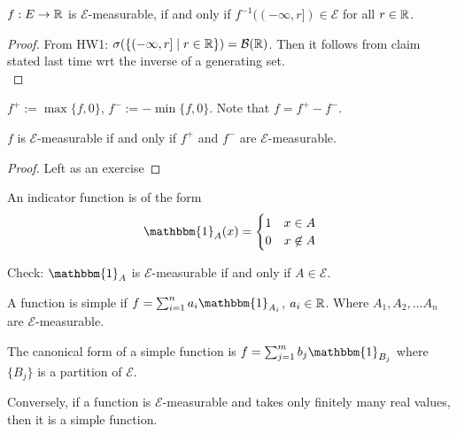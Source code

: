 \documentclass[english, course]{Notes}
\begin{document}
\begin{lemma}
$f: E \to \mathbb{R}$ is $\mathcal{E}$-measurable, if and only if $f^{-1}((-\infty, r]) \in \mathcal{E}$ for all $r \in \mathbb{R}$.\\
\end{lemma}

\begin{proof}
From HW1: $\sigma(\{(-\infty, r] \mid r \in \mathbb{R}\}) = \mathcal{B}(\mathbb{R})$. Then it follows from claim stated last time wrt the inverse of a generating set.\\
\end{proof}

\begin{definition}
$f^+:= \max\{f, 0\}$, $f^-:= -\min\{f, 0\}$. Note that $f = f^+ - f^-$.\\
\end{definition}

\begin{lemma}
$f$ is $\mathcal{E}$-measurable if and only if $f^+$ and $f^-$ are $\mathcal{E}$-measurable.
\end{lemma}

\begin{proof}
Left as an exercise
\end{proof}

\begin{definition}
An indicator function is of the form
\[\mathbbm{1}_A(x) =
\begin{cases}
1 & x \in A\\
0 & x \not \in A
\end{cases}\]
\end{definition}

Check: $\mathbbm{1}_A$ is $\mathcal{E}$-measurable if and only if $A \in \mathcal{E}$.\\

\begin{definition}
A function is simple if $f = \sum_{i = 1}^n a_i \mathbbm{1}_{A_i}$, $a_i \in \mathbb{R}$. Where $A_1, A_2, \dots A_n$ are $\mathcal{E}$-measurable.\\
\end{definition}

\begin{definition}
The canonical form of a simple function is $f = \sum_{j = 1}^m b_j \mathbbm{1}_{B_j}$ where $\{B_j\}$ is a partition of $\mathcal{E}$.\\
\end{definition}

\begin{fact}
Conversely, if a function is $\mathcal{E}$-measurable and takes only finitely many real values, then it is a simple function.
\end{fact}
\end{document}
